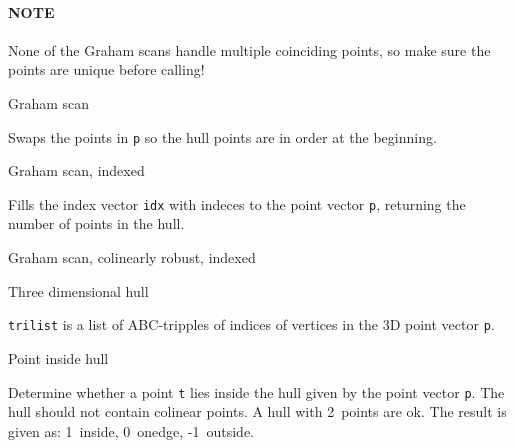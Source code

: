 
\paragraph{NOTE} None of the Graham scans handle multiple coinciding points,
so make sure the points are unique before calling!

\begin{algorithm}{Graham scan}

Swaps the points in {\tt p} so the hull points are in order at the beginning.
\end{algorithm}

\begin{algorithm}{Graham scan, indexed}

Fills the index vector {\tt idx} with indeces to the point vector {\tt p},
returning the number of points in the hull.
\end{algorithm}

\begin{algorithm}{Graham scan, colinearly robust, indexed}

\end{algorithm}

\begin{algorithm}{Three dimensional hull}


{\tt trilist} is a list of ABC-tripples of indices of vertices in the 3D
point vector {\tt p}.
\end{algorithm}

\begin{algorithm}{Point inside hull}

Determine whether a point {\tt t} lies inside the hull given by the
point vector {\tt p}. The hull should not contain colinear points. A hull with
2~points are ok. The result is given as: 1~inside, 0~onedge, -1~outside.
\end{algorithm}

